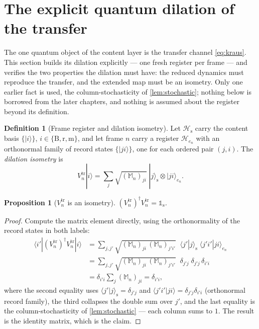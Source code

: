 \documentclass[11pt]{amsbook}
\theoremstyle{plain}
\newtheorem{proposition}[theorem]{Proposition}
\theoremstyle{definition}
\newtheorem{definition}[theorem]{Definition}
\theoremstyle{remark}
\newcommand{\uses}[1]{\par\nopagebreak\noindent{\footnotesize\emph{Uses: #1.}\par}}
\begin{document}
\section{The explicit quantum dilation of the transfer}\label{sec:transfer-dilation}

The one quantum object of the content layer is the transfer channel \cref{eq:kraus}. This section builds its dilation explicitly --- one fresh register per frame --- and verifies the two properties the dilation must have: the reduced dynamics must reproduce the transfer, and the extended map must be an isometry. Only one earlier fact is used, the column-stochasticity of \cref{lem:stochastic}; nothing below is borrowed from the later chapters, and nothing is assumed about the register beyond its definition.

\begin{definition}[Frame register and dilation isometry]\label{def:isometry}
Let $\mathcal H_{\mathrm s}$ carry the content basis $\{|i\rangle\}$, $i \in \{\mathrm B, \mathrm r, \mathrm m\}$, and let frame $n$ carry a register $\mathcal H_{e_{n}}$ with an orthonormal family of record states $\{|ji\rangle\}$, one for each ordered pair $(j, i)$. The \emph{dilation isometry} is
\begin{equation}\label{eq:isometry}
V_{n}^{\mathrm{tr}} |i\rangle = \sum_{j} \sqrt{(\mathbb{M}_{n})_{ji}}\; |j\rangle_{\mathrm s} \otimes |ji\rangle_{e_{n}}.
\end{equation}
\end{definition}

\begin{proposition}[$V_{n}^{\mathrm{tr}}$ is an isometry]\label{prop:isometry}
$(V_{n}^{\mathrm{tr}})^{\dagger} V_{n}^{\mathrm{tr}} = \mathbb{1}_{\mathrm s}$.
\uses{\cref{eq:isometry}, \cref{lem:stochastic}}
\end{proposition}

\begin{proof}
Compute the matrix element directly, using the orthonormality of the record states in both labels:
\begin{equation}\label{eq:vdagv}
\begin{aligned}
\langle i' | (V_{n}^{\mathrm{tr}})^{\dagger} V_{n}^{\mathrm{tr}} | i \rangle
&= \sum_{j, j'} \sqrt{(\mathbb{M}_{n})_{ji}\,(\mathbb{M}_{n})_{j'i'}}\;\; \langle j' | j \rangle_{\mathrm s}\; \langle j' i' | j i \rangle_{e_{n}}\\
&= \sum_{j, j'} \sqrt{(\mathbb{M}_{n})_{ji}\,(\mathbb{M}_{n})_{j'i'}}\;\; \delta_{j' j}\; \delta_{j' j}\,\delta_{i' i}\\
&= \delta_{i' i} \sum_{j} (\mathbb{M}_{n})_{ji}
= \delta_{i' i},
\end{aligned}
\end{equation}
where the second equality uses $\langle j'|j\rangle_{\mathrm s} = \delta_{j'j}$ and $\langle j'i'|ji\rangle = \delta_{j'j}\delta_{i'i}$ (orthonormal record family), the third collapses the double sum over $j'$, and the last equality is the column-stochasticity of \cref{lem:stochastic} --- each column sums to $1$. The result is the identity matrix, which is the claim.
\end{proof}
\end{document}

